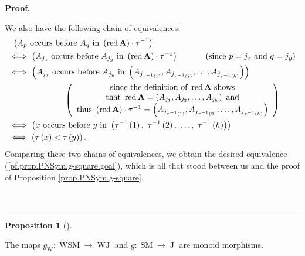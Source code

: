 \documentclass[numbers=enddot,12pt,final,onecolumn,notitlepage]{scrartcl}%
\theoremstyle{definition}
\newtheorem{prop}[theo]{Proposition}
\newenvironment{proposition}[1][]
{\begin{prop}[#1]\begin{leftbar}}
{\end{leftbar}\end{prop}}
\newenvironment{fineprint}{\begin{small}}{\end{small}}
\newenvironment{proof}[1][Proof]{\noindent\textbf{#1.} }{\ \rule{0.5em}{0.5em}}
\begin{document}
\begin{proof}
\begin{fineprint}
We also have the following chain of equivalences:%
\begin{align*}
&  \ \left(  A_{p}\text{ occurs before }A_{q}\text{ in }\left(
\operatorname*{red}\mathbf{A}\right)  \cdot\tau^{-1}\right) \\
&  \Longleftrightarrow\ \left(  A_{j_{x}}\text{ occurs before }A_{j_{y}}\text{
in }\left(  \operatorname*{red}\mathbf{A}\right)  \cdot\tau^{-1}\right)
\ \ \ \ \ \ \ \ \ \ \left(  \text{since }p=j_{x}\text{ and }q=j_{y}\right) \\
&  \Longleftrightarrow\ \left(  A_{j_{x}}\text{ occurs before }A_{j_{y}}\text{
in }\left(  A_{j_{\tau^{-1}\left(  1\right)  }},A_{j_{\tau^{-1}\left(
2\right)  }},\ldots,A_{j_{\tau^{-1}\left(  h\right)  }}\right)  \right) \\
&  \ \ \ \ \ \ \ \ \ \ \ \ \ \ \ \ \ \ \ \ \left(
\begin{array}
[c]{c}%
\text{since the definition of }\operatorname*{red}\mathbf{A}\text{ shows}\\
\text{that }\operatorname*{red}\mathbf{A}=\left(  A_{j_{1}},A_{j_{2}}%
,\ldots,A_{j_{h}}\right)  \text{ and}\\
\text{thus }\left(  \operatorname*{red}\mathbf{A}\right)  \cdot\tau
^{-1}=\left(  A_{j_{\tau^{-1}\left(  1\right)  }},A_{j_{\tau^{-1}\left(
2\right)  }},\ldots,A_{j_{\tau^{-1}\left(  h\right)  }}\right)
\end{array}
\right) \\
&  \Longleftrightarrow\ \left(  x\text{ occurs before }y\text{ in }\left(
\tau^{-1}\left(  1\right)  ,\ \tau^{-1}\left(  2\right)  ,\ \ldots,\ \tau
^{-1}\left(  h\right)  \right)  \right) \\
&  \Longleftrightarrow\ \left(  \tau\left(  x\right)  <\tau\left(  y\right)
\right)  .
\end{align*}
Comparing these two chains of equivalences, we obtain the desired equivalence
(\ref{pf.prop.PNSym.g-square.goal}), which is all that stood between us and
the proof of Proposition \ref{prop.PNSym.g-square}.
\end{fineprint}
\end{proof}

\begin{proposition}
\label{prop.PNSym.g-mon}The maps $g_{\operatorname*{W}}:\operatorname*{WSM}%
\rightarrow\operatorname*{WJ}$ and $g:\operatorname*{SM}\rightarrow
\operatorname*{J}$ are monoid morphisms.
\end{proposition}
\end{document}

